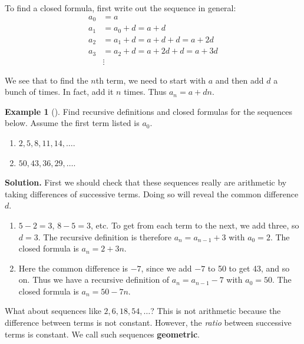 \documentclass[12pt,]{book}
\newcommand{\terminology}[1]{\textbf{#1}}
\theoremstyle{plain}
\theoremstyle{definition}
\theoremstyle{definition}
\newtheorem{example}[theorem]{Example}
\theoremstyle{definition}
\numberwithin{equation}{chapter}
\newcommand{\amp}{&}
\begin{document}
%
\par
\hypertarget{p-106}{}%
To find a closed formula, first write out the sequence in general:%
\begin{align*}
a_0 \amp = a\\
a_1 \amp = a_0 + d = a+d\\
a_2 \amp = a_1 + d = a+d+d = a+2d\\
a_3 \amp = a_2 + d = a+2d+d = a+3d\\
\amp \vdots 
\end{align*}
%
\par
\hypertarget{p-107}{}%
We see that to find the \(n\)th term, we need to start with \(a\) and then add \(d\) a bunch of times. In fact, add it \(n\) times. Thus \(a_n = a+dn\).%
\begin{example}[]\label{example-5}
\hypertarget{p-108}{}%
Find recursive definitions and closed formulas for the sequences below. Assume the first term listed is \(a_0\).%
\par
\hypertarget{p-109}{}%
\leavevmode%
\begin{enumerate}
\item\hypertarget{li-74}{}\(2, 5, 8, 11, 14, \ldots\).%
\item\hypertarget{li-75}{}\(50, 43, 36, 29, \ldots\).%
\end{enumerate}
%
\par\smallskip%
\noindent\textbf{Solution.}\hypertarget{solution-7}{}\quad%
\hypertarget{p-110}{}%
First we should check that these sequences really are arithmetic by taking differences of successive terms. Doing so will reveal the common difference \(d\).%
\par
\hypertarget{p-111}{}%
\leavevmode%
\begin{enumerate}
\item\hypertarget{li-76}{}\(5-2 = 3\), \(8-5 = 3\), etc. To get from each term to the next, we add three, so \(d = 3\). The recursive definition is therefore \(a_n = a_{n-1} + 3\) with \(a_0 = 2\). The closed formula is \(a_n = 2 + 3n\).%
\item\hypertarget{li-77}{}\hypertarget{p-112}{}%
Here the common difference is \(-7\), since we add \(-7\) to 50 to get 43, and so on. Thus we have a recursive definition of \(a_n = a_{n-1} - 7\) with \(a_0 = 50\). The closed formula is \(a_n = 50 - 7n\).%
\end{enumerate}
%
\end{example}
\hypertarget{p-113}{}%
What about sequences like \(2, 6, 18, 54, \ldots\)? This is not arithmetic because the difference between terms is not constant. However, the \emph{ratio} between successive terms is constant. We call such sequences \terminology{geometric}.%
\end{document}
